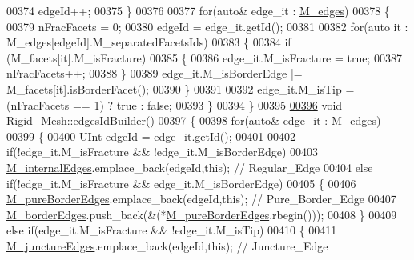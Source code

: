 \begin{DoxyCode}
00374         edgeId++;
00375     \}
00376 
00377     \textcolor{keywordflow}{for}(\textcolor{keyword}{auto}& edge\_it : \hyperlink{classFVCode3D_1_1Rigid__Mesh_a4c6287c9256a92c13486048c372fe487}{M\_edges})
00378     \{
00379         nFracFacets = 0;
00380         edgeId = edge\_it.getId();
00381 
00382         \textcolor{keywordflow}{for}(\textcolor{keyword}{auto} it : M\_edges[edgeId].M\_separatedFacetsIds)
00383         \{
00384             \textcolor{keywordflow}{if} (M\_facets[it].M\_isFracture)
00385             \{
00386                 edge\_it.M\_isFracture = \textcolor{keyword}{true};
00387                 nFracFacets++;
00388             \}
00389             edge\_it.M\_isBorderEdge |= M\_facets[it].isBorderFacet();
00390         \}
00391 
00392         edge\_it.M\_isTip = (nFracFacets == 1) ? \textcolor{keyword}{true} : \textcolor{keyword}{false};
00393     \}
00394 \}
00395 
\hypertarget{RigidMesh_8cpp_source.tex_l00396}{}\hyperlink{classFVCode3D_1_1Rigid__Mesh_a68a8a1bcfe66af2379baa44772026fd3}{00396} \textcolor{keywordtype}{void} \hyperlink{classFVCode3D_1_1Rigid__Mesh_a68a8a1bcfe66af2379baa44772026fd3}{Rigid\_Mesh::edgesIdBuilder}()
00397 \{
00398     \textcolor{keywordflow}{for}(\textcolor{keyword}{auto}& edge\_it : \hyperlink{classFVCode3D_1_1Rigid__Mesh_a4c6287c9256a92c13486048c372fe487}{M\_edges})
00399     \{
00400         \hyperlink{namespaceFVCode3D_a4bf7e328c75d0fd504050d040ebe9eda}{UInt} edgeId = edge\_it.getId();
00401 
00402         \textcolor{keywordflow}{if}(!edge\_it.M\_isFracture && !edge\_it.M\_isBorderEdge)
00403             \hyperlink{classFVCode3D_1_1Rigid__Mesh_a3b689233b2590d76d663195b89d380fb}{M\_internalEdges}.emplace\_back(edgeId,\textcolor{keyword}{this}); \textcolor{comment}{// Regular\_Edge}
00404         \textcolor{keywordflow}{else} \textcolor{keywordflow}{if}(!edge\_it.M\_isFracture && edge\_it.M\_isBorderEdge)
00405         \{
00406             \hyperlink{classFVCode3D_1_1Rigid__Mesh_a72e5bc2acebdc3bca417fa55dfd4c8c0}{M\_pureBorderEdges}.emplace\_back(edgeId,\textcolor{keyword}{this}); \textcolor{comment}{// Pure\_Border\_Edge}
00407             \hyperlink{classFVCode3D_1_1Rigid__Mesh_af9ba7882baec8f8e5e7693a38f3cbc9b}{M\_borderEdges}.push\_back(&(*\hyperlink{classFVCode3D_1_1Rigid__Mesh_a72e5bc2acebdc3bca417fa55dfd4c8c0}{M\_pureBorderEdges}.rbegin()));
00408         \}
00409         \textcolor{keywordflow}{else} \textcolor{keywordflow}{if}(edge\_it.M\_isFracture && !edge\_it.M\_isTip)
00410         \{
00411             \hyperlink{classFVCode3D_1_1Rigid__Mesh_a01850de43f4d5d1dcf617d7697bcf3e8}{M\_junctureEdges}.emplace\_back(edgeId,\textcolor{keyword}{this}); \textcolor{comment}{// Juncture\_Edge}

\end{DoxyCode}

